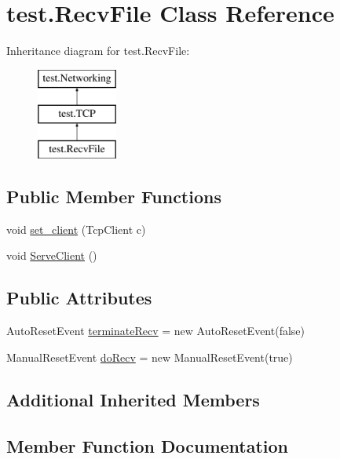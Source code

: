 \hypertarget{classtest_1_1_recv_file}{}\section{test.\+Recv\+File Class Reference}
\label{classtest_1_1_recv_file}
Inheritance diagram for test.\+Recv\+File\+:\begin{figure}[H]
\begin{center}
\leavevmode
\includegraphics[height=3.000000cm]{classtest_1_1_recv_file}
\end{center}
\end{figure}
\subsection*{Public Member Functions}
\begin{DoxyCompactItemize}
\item 
void \hyperlink{classtest_1_1_recv_file_a0e6bbcecdfb580fbb520d155994a66a7}{set\+\_\+client} (Tcp\+Client c)
\item 
void \hyperlink{classtest_1_1_recv_file_af1f945c3f24c1954370ed848ad6641ed}{Serve\+Client} ()
\end{DoxyCompactItemize}
\subsection*{Public Attributes}
\begin{DoxyCompactItemize}
\item 
Auto\+Reset\+Event \hyperlink{classtest_1_1_recv_file_a14b90e9794320b36423e808e15a6ba6d}{terminate\+Recv} = new Auto\+Reset\+Event(false)
\item 
Manual\+Reset\+Event \hyperlink{classtest_1_1_recv_file_a3e02ab7bb6ce782c0f6a60d1953ed177}{do\+Recv} = new Manual\+Reset\+Event(true)
\end{DoxyCompactItemize}
\subsection*{Additional Inherited Members}


\subsection{Member Function Documentation}
\mbox{\label{classtest_1_1_recv_file_af1f945c3f24c1954370ed848ad6641ed}} 

